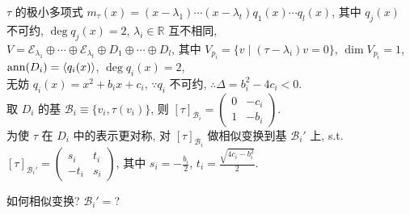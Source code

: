 \documentclass{note}
\begin{document}
\begin{pf}
    $\tau$ 的极小多项式 $m_{\tau}(x)=(x-\lambda_1)\cdots(x-\lambda_t)q_1(x)\cdots q_l(x)$, 其中 $q_j(x)$ 不可约, $\deg q_j(x)=2$, $\lambda_i\in\mathbb{R}$ 互不相同,\\
    $V=\mathcal{E}_{\lambda_1}\oplus\cdots\oplus\mathcal{E}_{\lambda_t}\oplus D_1\oplus\cdots\oplus D_l$, 其中 $V_{p_i}=\{v\mid(\tau-\lambda_i)v=0\}$, $\dim V_{p_i}=1$, $\operatorname{ann}(D_i)=\langle q_i(x)\rangle$, $\deg q_i(x)=2$,\\
    无妨 $q_i(x)=x^2+b_ix+c_i$, $\because q_i$ 不可约, $\therefore\Delta=b_i^2-4c_i<0$.\\
    取 $D_i$ 的基 $\mathcal{B}_i\equiv\{v_i,\tau(v_i)\}$, 则 $[\tau]_{\mathcal{B}_i}=\begin{pmatrix}
        0&-c_i\\
        1&-b_i
    \end{pmatrix}$.\\
    为使 $\tau$ 在 $D_i$ 中的表示更对称, 对 $[\tau]_{\mathcal{B}_i}$ 做相似变换到基 $\mathcal{B}_i'$ 上, s.t. $[\tau]_{\mathcal{B}_i'}=\begin{pmatrix}
        s_i&t_i\\
        -t_i&s_i
    \end{pmatrix}$, 其中 $s_i=-\frac{b_i}{2}$, $t_i=\frac{\sqrt{4c_i-b_i^2}}{2}$.
    \begin{prob}
        如何相似变换? $\mathcal{B}_i'=$?
    \end{prob}
\end{pf}
\end{document}
